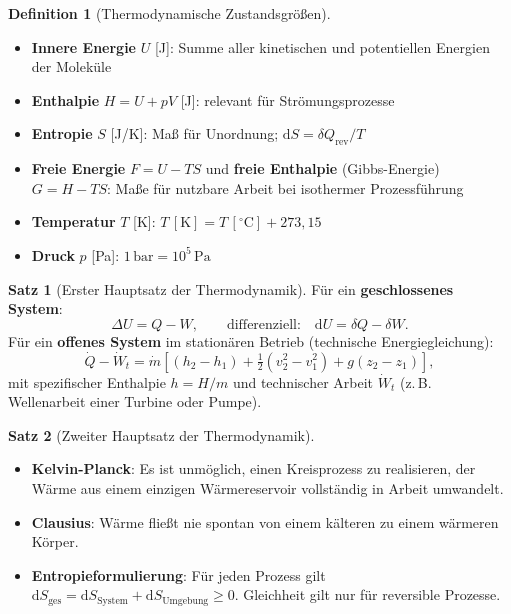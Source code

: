 ﻿\documentclass[a4paper,12pt]{report}
\theoremstyle{definition}
\newtheorem{definition}{Definition}
\newtheorem{satz}{Satz}
\begin{document}
\begin{definition}[Thermodynamische Zustandsgr\"o\ss{}en]
\begin{itemize}
    \item[-] \textbf{Innere Energie} $U$ [J]: Summe aller kinetischen und
          potentiellen Energien der Molek\"ule
    \item[-] \textbf{Enthalpie} $H = U + pV$ [J]: relevant f\"ur Str\"omungsprozesse
    \item[-] \textbf{Entropie} $S$ [J/K]: Ma\ss{} f\"ur Unordnung; $\mathrm{d}S = \delta Q_{\text{rev}}/T$
    \item[-] \textbf{Freie Energie} $F = U - TS$ und
          \textbf{freie Enthalpie} (Gibbs-Energie) $G = H - TS$:
          Ma\ss{}e f\"ur nutzbare Arbeit bei isothermer Prozessf\"uhrung
    \item[-] \textbf{Temperatur} $T$ [K]: $T\,[\mathrm{K}] = T\,[\mathrm{^\circ C}] + 273{,}15$
    \item[-] \textbf{Druck} $p$ [Pa]: $1\,\mathrm{bar} = 10^5\,\mathrm{Pa}$
\end{itemize}
\end{definition}

\begin{satz}[Erster Hauptsatz der Thermodynamik]
F\"ur ein \textbf{geschlossenes System}:
\[
  \Delta U = Q - W, \qquad \text{differenziell:} \quad \mathrm{d}U = \delta Q - \delta W.
\]
F\"ur ein \textbf{offenes System} im station\"aren Betrieb
(technische Energiegleichung):
\[
  \dot{Q} - \dot{W}_t = \dot{m}\left[(h_2 - h_1) + \tfrac{1}{2}(v_2^2 - v_1^2) + g(z_2 - z_1)\right],
\]
mit spezifischer Enthalpie $h = H/m$ und technischer Arbeit $\dot{W}_t$
(z.\,B. Wellenarbeit einer Turbine oder Pumpe).
\end{satz}

\begin{satz}[Zweiter Hauptsatz der Thermodynamik]
\begin{itemize}
    \item[-] \textbf{Kelvin-Planck}: Es ist unm\"oglich, einen Kreisprozess zu
          realisieren, der W\"arme aus einem einzigen W\"armereservoir vollst\"andig
          in Arbeit umwandelt.
    \item[-] \textbf{Clausius}: W\"arme flie\ss{}t nie spontan von einem k\"alteren
          zu einem w\"armeren K\"orper.
    \item[-] \textbf{Entropieformulierung}: F\"ur jeden Prozess gilt
          $\mathrm{d}S_{\text{ges}} = \mathrm{d}S_{\text{System}} + \mathrm{d}S_{\text{Umgebung}} \ge 0$.
          Gleichheit gilt nur f\"ur reversible Prozesse.
\end{itemize}
\end{satz}
\end{document}
